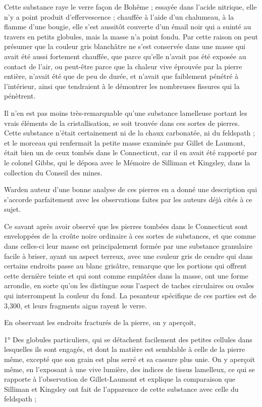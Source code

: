 \documentclass[a4paper, 12pt, oneside, french]{article}
\begin{document}
Cette substance raye le verre façon de Bohême ; essayée dans l'acide nitrique, elle n'y a point produit d'effervescence ; chauffée à l'aide d'un chalumeau, à la flamme d'une bougie, elle s'est aussitôt couverte d'un émail noir qui a suinté au travers en petits globules, mais la masse n'a point fondu. Par cette raison on peut présumer que la couleur gris blanchâtre ne s'est conservée dans une masse qui avait été aussi fortement chauffée, que parce qu'elle n'avait pas été exposée au contact de l'air, ou peut-être parce que la chaleur vive éprouvée par la pierre entière, n'avait été que de peu de durée, et n'avait que faiblement pénétré à l'intérieur, ainsi que tendraient à le démontrer les nombreuses fissures qui la pénètrent.

Il n'en est pas moins très-remarquable qu'une substance lamelleuse portant les vrais éléments de la cristallisation, se soit trouvée dans ces sortes de pierres. Cette substance n'était certainement ni de la chaux carbonatée, ni du feldspath ; et le morceau qui renfermait la petite masse examinée par Gillet de Laumont, était bien un de ceux tombés dans le Connecticut, car il en avait été rapporté par le colonel Gibbs, qui le déposa avec le Mémoire de Silliman et Kingsley, dans la collection du Conseil des mines.

Warden auteur d'une bonne analyse de ces pierres en a donné une description qui s'accorde parfaitement avec les observations faites par les auteurs déjà cités à ce sujet.

Ce savant après avoir observé que les pierres tombées dans le Connecticut sont enveloppées de la croûte noire ordinaire à ces sortes de substances, et que comme dans celles-ci leur masse est principalement formée par une substance granulaire facile à briser, ayant un aspect terreux, avec une couleur gris de cendre qui dans certains endroits passe au blanc grisâtre, remarque que les portions qui offrent cette dernière teinte et qui sont comme empâtées dans la masse, ont une forme arrondie, en sorte qu'on les distingue sous l'aspect de taches circulaires ou ovales qui interrompent la couleur du fond. La pesanteur spécifique de ces parties est de 3,300, et leurs fragments aigus rayent le verre.

En observant les endroits fracturés de la pierre, on y aperçoit,

1° Des globules particuliers, qui se détachent facilement des petites cellules dans lesquelles ils sont engagés, et dont la matière est semblable à celle de la pierre même, excepté que son grain est plus serré et sa cassure plus unie. On y aperçoit même, en l'exposant à une vive lumière, des indices de tissus lamelleux, ce qui se rapporte à l'observation de Gillet-Laumont et explique la comparaison que Silliman et Kingsley ont fait de l'apparence de cette substance avec celle du feldspath ;
\end{document}
